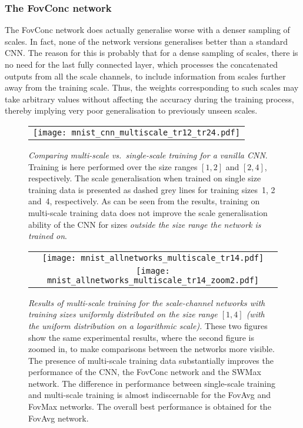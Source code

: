 \documentclass[twocolumn,runningheads]{svjour3}
\begin{document}
\subsubsection{The FovConc network}

The FovConc network does actually generalise worse with a denser sampling
of scales. In fact, none of the network versions generalises better
than a standard CNN. The reason for this is probably that for a dense
sampling of scales, there is no need for the last fully connected
layer, which processes the concatenated outputs from all the scale
channels, to include information from scales further away from the
training scale. Thus, the weights corresponding to such scales may
take arbitrary values without affecting the accuracy during the
training process, thereby implying very poor generalisation to
previously unseen scales.

\begin{figure}[hbpt]
	\begin{tabular}{c}
		\texttt{[image: mnist\_cnn\_multiscale\_tr12\_tr24.pdf]}  
	\end{tabular}
	\caption{{\em Comparing multi-scale vs.\ single-scale training
            for a vanilla CNN\/}. Training is here performed over the
          size ranges $[1, 2]$ and $[2, 4]$, respectively. The scale generalisation when
          trained on single size training data is presented as dashed
          grey lines for training sizes~1, 2 and~4, respectively. As can be seen from the results,
          training on multi-scale training
          data does not improve the scale generalisation ability of the CNN for
          sizes {\em outside the size range the network is trained on\/}.}
        \label{fig-multi-scale-training-CNN}
\end{figure}

\begin{figure}[hbpt]
   \begin{tabular}{c}
\texttt{[image: mnist\_allnetworks\_multiscale\_tr14.pdf]}  \\
\texttt{[image: mnist\_allnetworks\_multiscale\_tr14\_zoom2.pdf]}  
   \end{tabular}
   \caption{{\em Results of multi-scale training for the scale-channel
       networks with training sizes uniformly distributed on the size
       range $[1, 4]$ (with the uniform distribution on a logarithmic scale)\/.}
     These two figures show the same experimental results,
     where the second figure is zoomed in, to make comparisons between the networks more visible.
     The presence of multi-scale training data substantially improves the
     performance of the CNN, the FovConc network and the SWMax
     network. The difference in performance between
     single-scale training and multi-scale training is almost
     indiscernable for the FovAvg and FovMax networks.
     The overall best performance is 
     obtained for the FovAvg network.}
      \label{fig-multi-scale-training-scale-ch-networks}
\end{figure}
   
\end{document}
